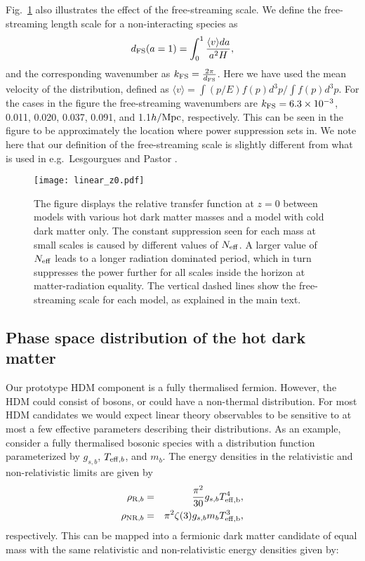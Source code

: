 \documentclass[11pt,a4paper]{article}
\renewcommand\({\left(}
\renewcommand\){\right)}
\renewcommand\[{\left[}
\renewcommand\]{\right]}
\begin{document}
Fig.~\ref{fig:linear} also illustrates the effect of the free-streaming scale.
We define the free-streaming length scale for a non-interacting species as
\begin{equation}
d_{\rm FS}(a=1) = \int_0^1 \frac{\langle v \rangle da}{a^2 H},
\end{equation}
and the corresponding wavenumber as $k_{\rm FS} = \frac{2 \pi}{d_{\rm FS}}$.
Here we have used the mean velocity of the distribution, defined as $\langle v \rangle = \int (p/E) f(p) d^3 p/\int f(p) d^3p$.
For the cases in the figure the free-streaming wavenumbers are
$k_{\rm FS} = 6.3 \times 10^{-3}$, 0.011, 0.020, 0.037, 0.091, and 1.1$h/{\rm Mpc}$, respectively. This can be seen in the figure to be approximately the location where power suppression sets in.
We note here that our definition of the free-streaming scale is slightly different from what is used in e.g.\ Lesgourgues and Pastor
\cite{Lesgourgues:2006nd}.


 \begin{figure}[t]
   \vspace*{-2.8cm}
\begin{center}
\hspace*{-0.5cm}
\texttt{[image: linear\_z0.pdf]}
\end{center}
 \vspace*{-3.0cm}
\caption{The figure displays the relative transfer function at $z=0$ between models with various hot dark matter masses and a model with cold dark matter only. The constant suppression seen for each mass at small scales is caused by different values of $N_{\rm eff}$. A larger value of $N_{\rm eff}$ leads to a longer radiation dominated period, which in turn suppresses the power further for all scales inside the horizon at matter-radiation equality. The vertical dashed lines show the free-streaming scale for each model, as explained in the main text.}
   \label{fig:linear}
\end{figure}


\subsection{Phase space distribution of the hot dark matter}\label{sec:fermionvsboson}

Our prototype HDM component is a fully thermalised fermion. However, the HDM could consist of bosons, or could have a non-thermal distribution.
For most HDM candidates we would expect linear theory observables to be sensitive to at most a few effective parameters describing their distributions. 
As an example, consider a fully thermalised bosonic species with a distribution function parameterized by $g_{s,b}$, $T_{{\rm eff},b}$, and $m_b$. The energy densities in the relativistic and non-relativistic limits are given by
\begin{eqnarray}
\rho_{{\rm R},b} & = & \frac{\pi^2}{30} g_{s,b} T_{\rm eff,b}^4, \\
\rho_{{\rm NR},b} & = & \pi^2 \zeta(3) g_{s,b} m_b T_{\rm eff,b}^3,
\end{eqnarray}
respectively. This can be mapped into a fermionic dark matter candidate of equal mass with the same relativistic and non-relativistic energy densities given by:
\end{document}
